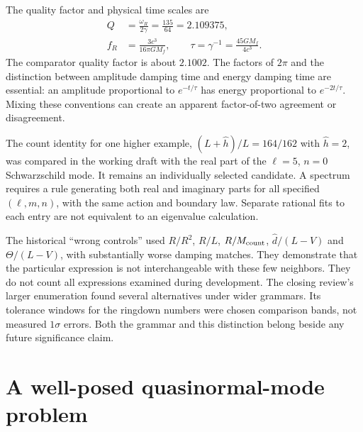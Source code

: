 The quality factor and physical time scales are
\begin{align}
 Q&=\frac{\omega_R}{2\gamma}=\frac{135}{64}=2.109375,
 \label{c11:q}\\
 f_R&=\frac{3c^3}{16\pi GM_f},\qquad
 \tau=\gamma^{-1}=\frac{45GM_f}{4c^3}.
 \label{c11:physicalscales}
\end{align}
The comparator quality factor is about $2.1002$. The factors of $2\pi$ and the distinction between amplitude damping time and energy damping time are essential: an amplitude proportional to $e^{-t/\tau}$ has energy proportional to $e^{-2t/\tau}$. Mixing these conventions can create an apparent factor-of-two agreement or disagreement.

The count identity for one higher example, $(L+\widehat h)/L=164/162$ with $\widehat h=2$, was compared in the working draft with the real part of the $\ell=5$, $n=0$ Schwarzschild mode. It remains an individually selected candidate. A spectrum requires a rule generating both real and imaginary parts for all specified $(\ell,m,n)$, with the same action and boundary law. Separate rational fits to each entry are not equivalent to an eigenvalue calculation.

The historical ``wrong controls'' used $R/R^2$, $R/L$, $R/M_{\rm count}$, $\widehat d/(L-V)$ and $\Theta/(L-V)$, with substantially worse damping matches. They demonstrate that the particular expression is not interchangeable with these few neighbors. They do not count all expressions examined during development. The closing review's larger enumeration found several alternatives under wider grammars. Its tolerance windows for the ringdown numbers were chosen comparison bands, not measured $1\sigma$ errors. Both the grammar and this distinction belong beside any future significance claim.

\section{A well-posed quasinormal-mode problem}
